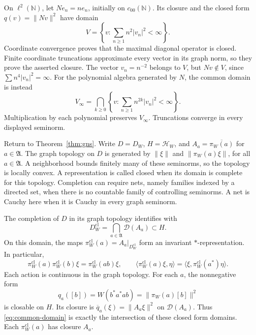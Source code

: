 \begin{example}
\label{ex:maximal-domain}
On $\ell^2(\mathbb N)$, let $Ne_n=ne_n$, initially on $c_{00}(\mathbb N)$.
Its closure and the closed form $q(v)=\|Nv\|^2$ have domain
\[
 V=\left\{v:\sum_{n\geq1}n^2|v_n|^2<\infty\right\}.
\]
Coordinate convergence proves that the maximal diagonal operator is closed.
Finite coordinate truncations approximate every vector in its graph norm,
so they prove the asserted closure.  The vector $v_n=n^{-2}$ belongs to $V$,
but $Nv\notin V$, since $\sum n^4|v_n|^2=\infty$.
For the polynomial algebra generated by $N$, the common domain is instead
\begin{equation}
 V_\infty=\bigcap_{k\geq0}
 \left\{v:\sum_{n\geq1}n^{2k}|v_n|^2<\infty\right\}.
 \label{eq:all-moments}
\end{equation}
Multiplication by each polynomial preserves $V_\infty$.
Truncations converge in every displayed seminorm.
\end{example}

Return to Theorem~\ref{thm:gns}.  Write $D=D_W$, $H=\mathcal H_W$,
and $A_a=\overline{\pi_W(a)}$ for $a\in\mathfrak A$.
The graph topology on $D$ is generated by $\|\xi\|$ and
$\|\pi_W(a)\xi\|$, for all $a\in\mathfrak A$.
A neighborhood bounds finitely many of these seminorms, so the topology
is locally convex.  A representation is called closed when its domain is
complete for this topology.  Completion can require nets, namely families
indexed by a directed set, when there is no countable family of controlling
seminorms.  A net is Cauchy here when it is Cauchy in every graph seminorm.

\begin{theorem}
\label{thm:graph-domain}
The completion of $D$ in its graph topology identifies with
\begin{equation}
 D_W^{\mathrm{cl}}=\bigcap_{a\in\mathfrak A}\mathcal D(A_a)
 \subset H.
 \label{eq:common-domain}
\end{equation}
On this domain, the maps $\pi_W^{\mathrm{cl}}(a)=A_a|_{D_W^{\mathrm{cl}}}$
form an invariant $*$-representation.  In particular,
\begin{equation}
 \pi_W^{\mathrm{cl}}(a)\pi_W^{\mathrm{cl}}(b)\xi
 =\pi_W^{\mathrm{cl}}(ab)\xi,
 \qquad
 \langle\pi_W^{\mathrm{cl}}(a)\xi,\eta\rangle
 =\langle\xi,\pi_W^{\mathrm{cl}}(a^*)\eta\rangle.
 \label{eq:closed-products}
\end{equation}
Each action is continuous in the graph topology.
For each $a$, the nonnegative form
\[
 q_a([b])=W(b^*a^*ab)=\|\pi_W(a)[b]\|^2
\]
is closable on $H$.  Its closure is $\overline q_a(\xi)=\|A_a\xi\|^2$
on $\mathcal D(A_a)$.  Thus \eqref{eq:common-domain} is exactly the
intersection of these closed form domains.
Each $\pi_W^{\mathrm{cl}}(a)$ has closure $A_a$.
\end{theorem}

